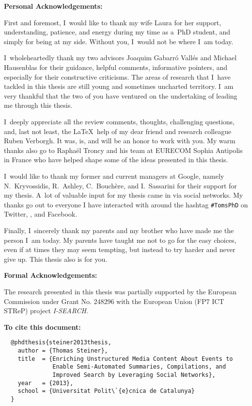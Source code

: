 \begin{acknowledgements}

\textbf{Personal Acknowledgements:}

First and foremost, I~would like to thank my wife Laura
for her support, understanding, patience, and energy
during my time as a~PhD student, and simply for being at my side.
Without you, I~would not be where I~am today.

I~wholeheartedly thank my two advisors Joaquim Gabarró Vallés
and Michael Hausenblas for their guidance, helpful comments,
informative pointers, and especially
for their constructive criticisms.
The areas of research that I~have tackled in this thesis
are still young and sometimes uncharted territory.
I~am very thankful that the two of you have ventured
on the undertaking of leading me through this thesis.

I~deeply appreciate all the review comments, thoughts, challenging questions,
and, last not least, the \LaTeX~help of my dear friend
and research colleague Ruben Verborgh.
It was, is, and will be an honor to work with you.
My warm thanks also go to Raphaël Troncy and his team
at \mbox{EURECOM} Sophia Antipolis in France
who have helped shape some of the ideas presented in this thesis.

I~would like to thank my former and current managers at Google,
namely N.~Kryvossidis, R.~Ashley, C.~Bouchère, and I.~Sassarini
for their support for my thesis.
A~lot of valuable input for my thesis came in via social networks.
My thanks go out to everyone I have interacted with
around the hashtag \texttt{\#TomsPhD}
on Twitter, \googleplus, and Facebook.

Finally, I~sincerely thank my parents and my brother
who have made me the person I~am today.
My parents have taught me
not to go for the easy choices, even
if at times they may seem tempting,
but instead to try harder and never give up.
This thesis also is for you.

\textbf{Formal Acknowledgements:}

The research presented in this thesis
was partially supported by the European Commission
under Grant No. 248296 with the European Union (FP7 ICT STReP)
project \mbox{\emph{I-SEARCH}}.

\vspace{80mm}

\textbf{To cite this document:}

\small
\begin{verbatim}
  @phdthesis{steiner2013thesis,
    author = {Thomas Steiner},
    title  = {Enriching Unstructured Media Content About Events to
              Enable Semi-Automated Summaries, Compilations, and
              Improved Search by Leveraging Social Networks},
    year   = {2013},
    school = {Universitat Polit\`{e}cnica de Catalunya}
  }
\end{verbatim}


\end{acknowledgements}

